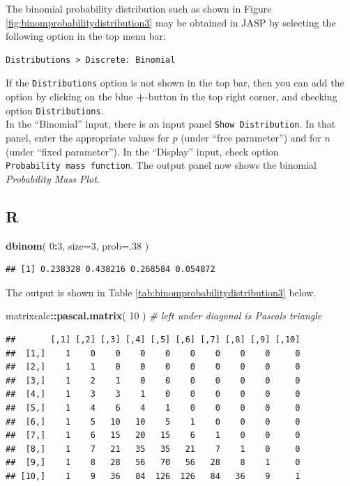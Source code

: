 \documentclass[
]{book}
\newenvironment{Shaded}{\begin{snugshade}}{\end{snugshade}}
\newcommand{\AttributeTok}[1]{\textcolor[rgb]{0.13,0.29,0.53}{#1}}
\newcommand{\CommentTok}[1]{\textcolor[rgb]{0.56,0.35,0.01}{\textit{#1}}}
\newcommand{\DecValTok}[1]{\textcolor[rgb]{0.00,0.00,0.81}{#1}}
\newcommand{\FunctionTok}[1]{\textcolor[rgb]{0.13,0.29,0.53}{\textbf{#1}}}
\newcommand{\NormalTok}[1]{#1}
\newcommand{\SpecialCharTok}[1]{\textcolor[rgb]{0.81,0.36,0.00}{\textbf{#1}}}
\begin{document}
The binomial probability distribution such as shown in Figure \ref{fig:binomprobabilitydistribution3} may be obtained in JASP by selecting the following option in the top menu bar:

\begin{verbatim}
Distributions > Discrete: Binomial
\end{verbatim}

If the \texttt{Distributions} option is not shown in the top bar, then you can add the option by clicking on the blue \textbf{+}-button in the top right corner, and checking option \texttt{Distributions}.\\
In the ``Binomial'' input, there is an input panel \texttt{Show\ Distribution}. In that panel, enter the appropriate values for \(p\) (under ``free parameter'') and for \(n\) (under ``fixed parameter''). In the ``Display'' input, check option \texttt{Probability\ mass\ function}.
The output panel now shows the binomial \emph{Probability Mass Plot}.

\hypertarget{r-4}{%
\subsection{R}\label{r-4}}

\begin{Shaded}
\begin{Highlighting}[]
\FunctionTok{dbinom}\NormalTok{( }\DecValTok{0}\SpecialCharTok{:}\DecValTok{3}\NormalTok{, }\AttributeTok{size=}\DecValTok{3}\NormalTok{, }\AttributeTok{prob=}\NormalTok{.}\DecValTok{38}\NormalTok{ )}
\end{Highlighting}
\end{Shaded}

\begin{verbatim}
## [1] 0.238328 0.438216 0.268584 0.054872
\end{verbatim}

The output is shown in Table \ref{tab:binomprobabilitydistribution3} below.

\begin{Shaded}
\begin{Highlighting}[]
\NormalTok{matrixcalc}\SpecialCharTok{::}\FunctionTok{pascal.matrix}\NormalTok{( }\DecValTok{10}\NormalTok{ ) }\CommentTok{\# left under diagonal is Pascal\textquotesingle{}s triangle}
\end{Highlighting}
\end{Shaded}

\begin{verbatim}
##       [,1] [,2] [,3] [,4] [,5] [,6] [,7] [,8] [,9] [,10]
##  [1,]    1    0    0    0    0    0    0    0    0     0
##  [2,]    1    1    0    0    0    0    0    0    0     0
##  [3,]    1    2    1    0    0    0    0    0    0     0
##  [4,]    1    3    3    1    0    0    0    0    0     0
##  [5,]    1    4    6    4    1    0    0    0    0     0
##  [6,]    1    5   10   10    5    1    0    0    0     0
##  [7,]    1    6   15   20   15    6    1    0    0     0
##  [8,]    1    7   21   35   35   21    7    1    0     0
##  [9,]    1    8   28   56   70   56   28    8    1     0
## [10,]    1    9   36   84  126  126   84   36    9     1
\end{verbatim}
\end{document}
